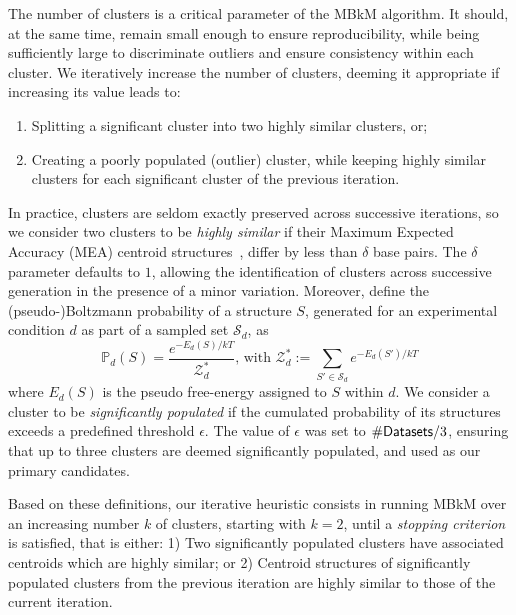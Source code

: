 \documentclass[a4,center,fleqn]{NAR}
\newcommand{\CL}{MBkM\xspace}
\newcommand{\NumClust}{k}
\newcommand{\Def}[1]{{\em #1}}
\begin{document}
The number of clusters is a critical parameter of the \CL{} algorithm. It should, at the same time, remain small enough to ensure reproducibility, while being sufficiently large to discriminate outliers and ensure consistency within each cluster. We iteratively increase the number of clusters, deeming it appropriate if increasing its value leads to:
\begin{enumerate} 
	\item Splitting a significant cluster into two highly similar clusters, or; 
	\item Creating a poorly populated (outlier) cluster, while keeping highly similar clusters for each significant cluster of the previous iteration.
\end{enumerate} 
In practice, clusters are seldom exactly preserved across successive iterations, so we consider two clusters to be \Def{highly similar} if their Maximum Expected Accuracy (MEA) centroid structures~\citep{Lu2009}, differ by less than $\delta$ base pairs.
The $\delta$ parameter defaults to $1$, allowing the identification of clusters across successive generation in the presence of a minor variation.
Moreover, define the (pseudo-)Boltzmann probability of a structure $S$, generated for an experimental condition $d$ as part of a sampled set $\mathcal{S}_d$, as
$$ \mathbb{P}_d(S) = \frac{e^{-E_d(S)/kT}}{\mathcal{Z}^*_d} \text{, with } \mathcal{Z}^*_d := \sum_{S'\in \mathcal{S}_d} e^{-E_d(S')/kT}$$
where $E_d(S)$ is the pseudo free-energy assigned to $S$ within $d$.
We consider a cluster to be \Def{significantly populated} if the cumulated probability of its structures exceeds a predefined threshold $\epsilon$. 
The value of $\epsilon$ was set to $\#{\sf Datasets}/3$, ensuring that up to three clusters are deemed significantly populated, and used as our primary candidates.

Based on these definitions, our iterative heuristic consists in running \CL over an increasing number $\NumClust$ of clusters, starting with $\NumClust=2$, until a \Def{stopping criterion} is satisfied, that is either: 1) Two significantly populated clusters have associated centroids which are highly similar; or 2) Centroid structures of significantly populated clusters from the previous iteration are highly similar to those of the current iteration.
\end{document}
